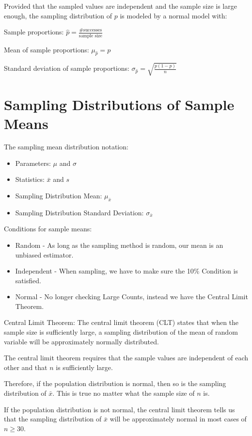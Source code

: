 \documentclass[../stats.tex]{subfiles}
\begin{document}
Provided that the sampled values are independent and the sample size is large enough, the sampling distribution of $p$ is modeled by a normal model with:

Sample proportions: $\hat{p}=\frac{\#\text{successes}}{\text{sample size}}$

Mean of sample proportions: $\mu_{\hat{p}}=p$

Standard deviation of sample proportions: $\sigma_{\hat{p}}=\sqrt{\frac{p(1-p)}{n}}$

\section{Sampling Distributions of Sample Means}
The sampling mean distribution notation:
\begin{itemize}
    \item Parameters: $\mu$ and $\sigma$
    \item Statistics: $\bar{x}$ and $s$
    \item Sampling Distribution Mean: $\mu_{\bar{x}}$
    \item Sampling Distribution Standard Deviation: $\sigma_{\bar{x}}$
\end{itemize}

Conditions for sample means:
\begin{itemize}
    \item Random - As long as the sampling method is random, our mean is an unbiased estimator.
    \item Independent - When sampling, we have to make sure the 10\% Condition is satisfied.
    \item Normal - No longer checking Large Counts, instead we have the Central Limit Theorem. 
\end{itemize}

Central Limit Theorem: The central limit theorem (CLT) states that when the sample size is sufficiently large, a sampling distribution of the mean of random variable will be approximately normally distributed.

The central limit theorem requires that the sample values are independent of each other and that $n$ is sufficiently large.

Therefore, if the population distribution is normal, then so is the sampling distribution of $\bar{x}$. This is true no matter what the sample size of $n$ is.

If the population distribution is not normal, the central limit theorem tells us that the sampling distribution of $\bar{x}$ will be approximately normal in most cases of $n\geq 30$.
\end{document}
